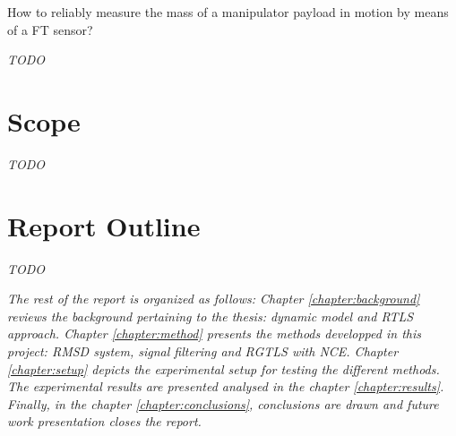 \documentclass[/home/francois/latex/report/main.tex]{subfiles}
\begin{document}
How to reliably measure the mass of a manipulator payload in motion by means of a \ac{FT} sensor?

\textit{TODO}

\section{Scope}

\textit{TODO}

{\it

}


\section{Report Outline}

\textit{TODO}

{\it
The rest of the report is organized as follows: Chapter \ref{chapter:background} reviews the background pertaining to the thesis: dynamic model and \ac{RTLS} approach. Chapter \ref{chapter:method} presents the methods developped in this project: \ac{RMSD} system, signal filtering and \ac{RGTLS} with \ac{NCE}. Chapter \ref{chapter:setup} depicts the experimental setup for testing the different methods. The experimental results are presented analysed in the chapter \ref{chapter:results}. Finally, in the chapter \ref{chapter:conclusions}, conclusions are drawn and future work presentation closes the report.
}
\end{document}
